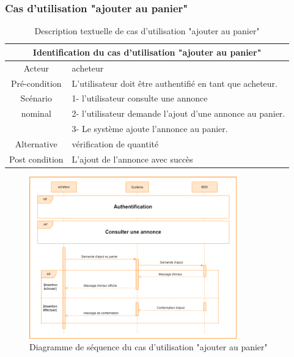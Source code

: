 \documentclass[edit,12pt,a4paper,ChapStyle,oneside,doubleinterligne]{report}
\begin{document}
\clearpage
\subsubsection{Cas d'utilisation "ajouter au panier"}
\begin{table}[h!]
    \centering
    \begin{tabular}{|c|m{10cm}|}
         \hline
         \multicolumn{2}{|c|}{Identification du cas d'utilisation "ajouter au panier" }\\
         \hline
         Acteur & acheteur\\
         \hline
         Pré-condition & L'utilisateur doit être authentifié en tant que acheteur. \\ 
         \hline
         Scénario& 1- l'utilisateur consulte une annonce\\
          nominal& 2- l'utilisateur demande l’ajout d’une annonce au panier.\\
          & 3- Le système ajoute l'annonce au panier. \\
         \hline
         Alternative  & vérification de quantité\\
         \hline
         Post condition& L’ajout de l'annonce avec succès \\
         \hline
    \end{tabular}
    \caption{Description textuelle de cas d'utilisation "ajouter au panier" }
    \label{tab:cas 9}
\end{table}
\begin{figure}[h!]\label{fig:Diagramme cas 9} 
\centering
\includegraphics[width=0.8\textwidth]{images/Ajouter au panier.png}
\caption{Diagramme de séquence du cas d'utilisation "ajouter au panier"}
\end{figure}
\end{document}
